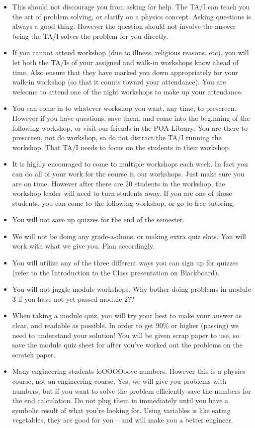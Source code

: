 \documentclass[12pt]{article}
\begin{document}
\begin{itemize}
	\item This should not discourage you from asking for help. The TA/I can teach you the art of problem solving, or clarify on a physics concept. Asking questions is always a good thing. However the question should not involve the answer being the TA/I solves the problem for you directly.
	\item If you cannot attend workshop (due to illness, religious reasons, etc), you will let both the TA/Is of your assigned and walk-in workshops know ahead of time. Also ensure that they have marked you down appropriately for your walk-in workshop (so that it counts toward your attendance). You are welcome to attend one of the night workshops to make up your attendance.
	\item You can come in to whatever workshop you want, any time, to prescreen. However if you have questions, save them, and come into the beginning of the following workshop, or visit our friends in the POA Library. You are there to prescreen, not do workshop, so do not distract the TA/I running the workshop. That TA/I needs to focus on the students in their workshop.
	\item It is highly encouraged to come to multiple workshops each week. In fact you can do all of your work for the course in our workshops. Just make sure you are on time. However after there are 20 students in the workshop, the workshop leader will need to turn students away. If you are one of those students, you can come to the following workshop, or go to free tutoring.
	\item You will not save up quizzes for the end of the semester.
	\item We will not be doing any grade-a-thons, or making extra quiz slots. You will work with what we give you. Plan accordingly.
	\item You will utilize any of the three different ways you can sign up for quizzes (refer to the Introduction to the Class presentation on Blackboard).
	\item You will not juggle module workshops. Why bother doing problems in module 3 if you have not yet passed module 2??
	\item When taking a module quiz, you will try your best to make your answer as clear, and readable as possible. In order to get 90\% or higher (passing) we need to understand your solution! You will be given scrap paper to use, so save the module quiz sheet for after you've worked out the problems on the scratch paper.
	\item Many engineering students loOOOOoove numbers. However this is a physics course, not an engineering course. Yes, we will give you problems with numbers, but if you want to solve the problem efficiently save the numbers for the end calculation. Do not plug them in immediately until you have a symbolic result of what you're looking for. Using variables is like eating vegetables, they are good for you -- and will make you a better engineer.

\end{itemize}
\end{document}
